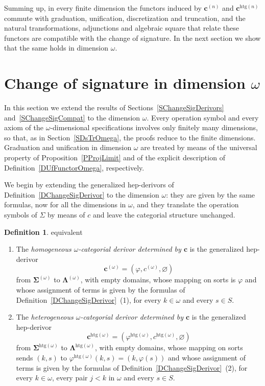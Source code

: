 \documentclass[a4paper, reqno]{amsbook}
\makeatletter
\newcommand{\sig}[1]{\mathbf{#1}}             %
\newcommand{\htg}{\mathrm{htg}}                %
\theoremstyle{plain}
\theoremstyle{definition}
\newtheorem{definition}[theorem]{Definition}
\newcommand*{\CA@leanpending}{}
\newcommand*{\CA@leanrelation}{}
\newcommand*{\lean}[2]{%
  \ifcsname\string\color@lean@#1\endcsname\else
    \PackageError{main}{Unknown relation `#1' in \string\lean}{Use equivalent, weaker or stronger.}%
  \fi
  \gdef\CA@leanrelation{#1}%
  \gdef\CA@leanpending{#2}}
\makeatother
\begin{document}
Summing up, in every finite dimension the functors induced by $\mathbf{c}^{(n)}$ and $\mathbf{c}^{\htg(n)}$ commute with graduation, unification, discretization and truncation, and the natural transformations, adjunctions and algebraic square that relate these functors are compatible with the change of signature.
In the next section we show that the same holds in dimension $\omega$.

\section{Change of signature in dimension \texorpdfstring{$\omega$}{omega}}\label{SChangeSigOmega}

In this section we extend the results of Sections~\ref{SChangeSigDerivors} and~\ref{SChangeSigCompat} to the dimension $\omega$.
Every operation symbol and every axiom of the $\omega$-dimensional specifications involves only finitely many dimensions, so that, as in Section~\ref{SDsTrOmega}, the proofs reduce to the finite dimensions.
Graduation and unification in dimension $\omega$ are treated by means of the universal property of Proposition~\ref{PProjLimit} and of the explicit description of Definition~\ref{DUfFunctorOmega}, respectively.

We begin by extending the generalized hep-derivors of Definition~\ref{DChangeSigDerivor} to the dimension $\omega$: they are given by the same formulas, now for all the dimensions in $\omega$, and they translate the operation symbols of $\Sigma$ by means of $c$ and leave the categorial structure unchanged.

\begin{definition}\label{DChangeSigDerivorOmega}\lean{equivalent}{ChangeOfSignature.homogeneous,ChangeOfSignature.heterogeneous}
\begin{enumerate}
\item The \emph{homogeneous $\omega$-categorial derivor determined by $\mathbf{c}$} is the generalized hep-derivor
$$
\mathbf{c}^{(\omega)}=\left(\varphi,c^{(\omega)},\varnothing\right)
$$
from $\sig{\Sigma}^{(\omega)}$ to $\sig{\Lambda}^{(\omega)}$, with empty domains, whose mapping on sorts is $\varphi$ and whose assignment of terms is given by the formulas of Definition~\ref{DChangeSigDerivor}~(1), for every $k\in\omega$ and every $s\in S$.
\item The \emph{heterogeneous $\omega$-categorial derivor determined by $\mathbf{c}$} is the generalized hep-derivor
$$
\mathbf{c}^{\htg(\omega)}=\left(\varphi^{\htg(\omega)},c^{\htg(\omega)},\varnothing\right)
$$
from $\sig{\Sigma}^{\htg(\omega)}$ to $\sig{\Lambda}^{\htg(\omega)}$, with empty domains, whose mapping on sorts sends $(k,s)$ to $\varphi^{\htg(\omega)}(k,s)=(k,\varphi(s))$ and whose assignment of terms is given by the formulas of Definition~\ref{DChangeSigDerivor}~(2), for every $k\in\omega$, every pair $j<k$ in $\omega$ and every $s\in S$.
\end{enumerate}
\end{definition}
\end{document}
